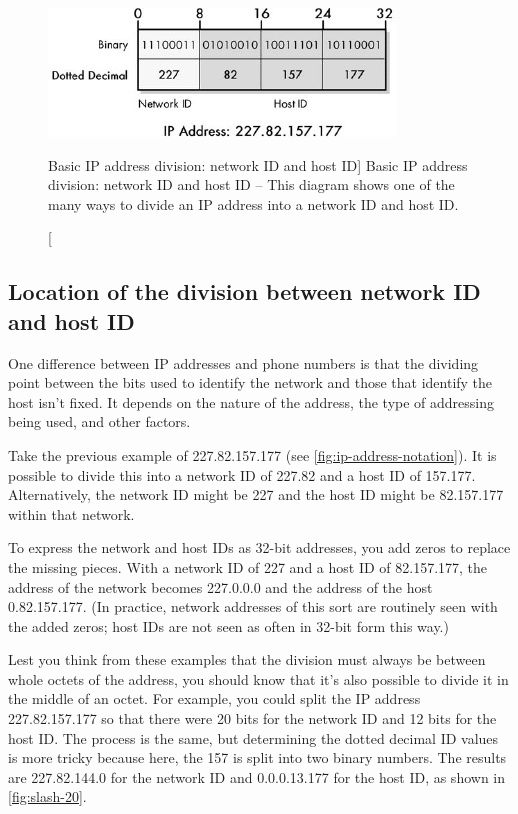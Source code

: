 \begin{figure}
   \centering
   \includegraphics[width=.6\textwidth]{images/ip-address-division.jpg}
   \caption
      [Basic IP address division: network ID and host ID]
      {Basic IP address division: network ID and host ID -- This diagram shows one of the many ways to divide an IP address into a network ID and host ID.}
   \label{fig:ip-address-division}
\end{figure}



\subsection{Location of the division between network ID and host ID}

One difference between IP addresses and phone numbers is that the
dividing point between the bits used to identify the network and those
that identify the host isn't fixed. It depends on the nature of the
address, the type of addressing being used, and other factors.

Take the previous example of 227.82.157.177 (see \vref{fig:ip-address-notation}).
It is possible to divide this into a network ID of 227.82 and a host ID of 157.177.
Alternatively, the network ID might be 227 and the host ID might be 82.157.177 within that network.

To express the network and host IDs as 32-bit addresses, you add zeros
to replace the missing pieces. With a network ID of 227 and a host ID of
82.157.177, the address of the network becomes 227.0.0.0 and the address
of the host 0.82.157.177.
(In practice, network addresses of this sort are routinely seen with the added zeros; host IDs are not seen as often in 32-bit form this way.)

Lest you think from these examples that the division
must always be between whole octets of the address, you should know that
it's also possible to divide it in the middle of an octet. For example,
you could split the IP address 227.82.157.177 so that there were 20 bits
for the network ID and 12 bits for the host ID. The process is the same,
but determining the dotted decimal ID values is more tricky because
here, the 157 is split into two binary numbers. The results are
227.82.144.0 for the network ID and 0.0.0.13.177 for the host ID, as
shown in \cref{fig:slash-20}.

